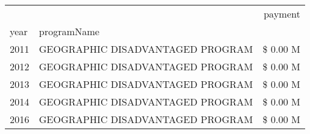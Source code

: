 \begin{tabular}{llr}
\toprule
 &  & payment \\
year & programName &  \\
\midrule
2011 & GEOGRAPHIC DISADVANTAGED PROGRAM & \$ 0.00 M \\
\cline{1-3}
2012 & GEOGRAPHIC DISADVANTAGED PROGRAM & \$ 0.00 M \\
\cline{1-3}
2013 & GEOGRAPHIC DISADVANTAGED PROGRAM & \$ 0.00 M \\
\cline{1-3}
2014 & GEOGRAPHIC DISADVANTAGED PROGRAM & \$ 0.00 M \\
\cline{1-3}
2016 & GEOGRAPHIC DISADVANTAGED PROGRAM & \$ 0.00 M \\
\cline{1-3}
\bottomrule
\end{tabular}
